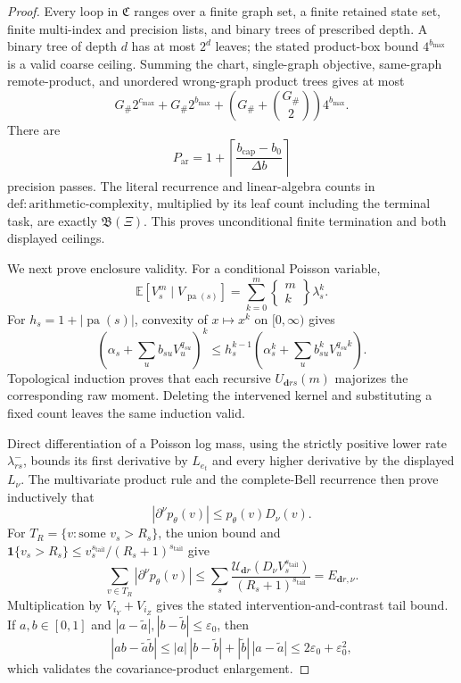 \documentclass{article}
\begin{document}
\begin{proof}
Every loop in \(\mathfrak C\) ranges over a finite graph set, a finite retained state set, finite multi-index and precision lists, and binary trees of prescribed depth.  A binary tree of depth \(d\) has at most \(2^d\) leaves; the stated product-box bound \(4^{b_{\max}}\) is a valid coarse ceiling.  Summing the chart, single-graph objective, same-graph remote-product, and unordered wrong-graph product trees gives at most
\[
 G_{\#}2^{c_{\max}}+G_{\#}2^{b_{\max}}
 +\left(G_{\#}+\binom{G_{\#}}2\right)4^{b_{\max}}. \tag{21}
\]
There are
\[
 P_{\mathrm{ar}}=1+
 \left\lceil\frac{b_{\mathrm{cap}}-b_0}{\Delta b}\right\rceil
\]
precision passes.  The literal recurrence and linear-algebra counts in \(\mathrm{def{:}arithmetic\text{-}complexity}\), multiplied by its leaf count including the terminal task, are exactly \(\mathfrak B(\Xi)\).  This proves unconditional finite termination and both displayed ceilings.

We next prove enclosure validity.  For a conditional Poisson variable,
\[
 \mathbb E[V_s^m\mid V_{\operatorname{pa}(s)}]
 =\sum_{k=0}^{m}
 \left\{\begin{matrix}m\\k\end{matrix}\right\}\lambda_s^k.
\]
For \(h_s=1+|\operatorname{pa}(s)|\), convexity of \(x\mapsto x^k\) on \([0,\infty)\) gives
\[
 \left(\alpha_s+\sum_u b_{su}V_u^{q_{su}}\right)^k
 \leq h_s^{k-1}
 \left(\alpha_s^k+
 \sum_u b_{su}^kV_u^{q_{su}k}\right). \tag{22}
\]
Topological induction proves that each recursive \(U_{\boldsymbol d rs}(m)\) majorizes the corresponding raw moment.  Deleting the intervened kernel and substituting a fixed count leaves the same induction valid.

Direct differentiation of a Poisson log mass, using the strictly positive lower rate \(\lambda^-_{rs}\), bounds its first derivative by \(L_{e_t}\) and every higher derivative by the displayed \(L_\nu\).  The multivariate product rule and the complete-Bell recurrence then prove inductively that
\[
 |\partial^\nu p_\theta(v)|\leq p_\theta(v)D_\nu(v). \tag{23}
\]
For \(T_R=\{v:\text{some }v_s>R_s\}\), the union bound and
\(\mathbf1\{v_s>R_s\}\leq v_s^{s_{\mathrm{tail}}}/(R_s+1)^{s_{\mathrm{tail}}}\) give
\[
 \sum_{v\in T_R}|\partial^\nu p_\theta(v)|
 \leq\sum_s
 \frac{\mathcal U_{\boldsymbol d r}(D_\nu V_s^{s_{\mathrm{tail}}})}
 {(R_s+1)^{s_{\mathrm{tail}}}}
 =E_{\boldsymbol d r,\nu}. \tag{24}
\]
Multiplication by \(V_{i_Y}+V_{i_Z}\) gives the stated intervention-and-contrast tail bound.  If \(a,b\in[0,1]\) and \(|a-\widetilde a|,|b-\widetilde b|\leq\varepsilon_0\), then
\[
 |ab-\widetilde a\widetilde b|
 \leq |a|\,|b-\widetilde b|+|\widetilde b|\,|a-\widetilde a|
 \leq2\varepsilon_0+\varepsilon_0^2, \tag{25}
\]
which validates the covariance-product enlargement.


\end{proof}
\end{document}
